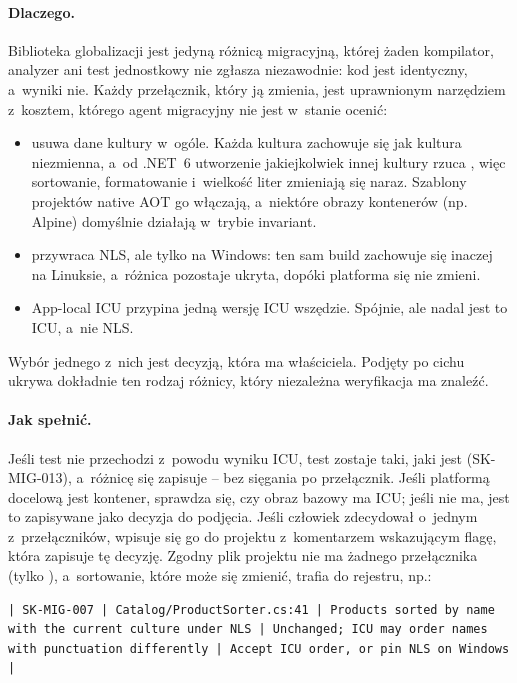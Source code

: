 \paragraph{Dlaczego.} Biblioteka globalizacji jest jedyną różnicą migracyjną, której żaden
kompilator, analyzer ani test jednostkowy nie zgłasza niezawodnie: kod jest identyczny,
a~wyniki nie. Każdy przełącznik, który ją zmienia, jest uprawnionym narzędziem z~kosztem,
którego agent migracyjny nie jest w~stanie ocenić:
\begin{itemize}
  \item {} usuwa dane kultury w~ogóle. Każda kultura
        zachowuje się jak kultura niezmienna, a~od .NET~6 utworzenie jakiejkolwiek innej
        kultury rzuca , więc sortowanie, formatowanie
        i~wielkość liter zmieniają się naraz. Szablony projektów native AOT go włączają,
        a~niektóre obrazy kontenerów (np. Alpine) domyślnie działają w~trybie invariant.
  \item {} przywraca NLS, ale tylko na Windows: ten sam build zachowuje
        się inaczej na Linuksie, a~różnica pozostaje ukryta, dopóki platforma się nie zmieni.
  \item App-local ICU przypina jedną wersję ICU wszędzie. Spójnie, ale nadal jest to ICU,
        a~nie NLS.
\end{itemize}
Wybór jednego z~nich jest decyzją, która ma właściciela. Podjęty po cichu ukrywa dokładnie
ten rodzaj różnicy, który niezależna weryfikacja ma znaleźć.

\paragraph{Jak spełnić.} Jeśli test nie przechodzi z~powodu wyniku ICU, test zostaje taki,
jaki jest (SK-MIG-013), a~różnicę się zapisuje -- bez sięgania po przełącznik. Jeśli
platformą docelową jest kontener, sprawdza się, czy obraz bazowy ma ICU; jeśli nie ma, jest
to zapisywane jako decyzja do podjęcia. Jeśli człowiek zdecydował o~jednym z~przełączników,
wpisuje się go do projektu z~komentarzem wskazującym flagę, która zapisuje tę decyzję.
Zgodny plik projektu nie ma żadnego przełącznika (tylko ),
a~sortowanie, które może się zmienić, trafia do rejestru, np.:

\begin{lstlisting}
| SK-MIG-007 | Catalog/ProductSorter.cs:41 | Products sorted by name with the current culture under NLS | Unchanged; ICU may order names with punctuation differently | Accept ICU order, or pin NLS on Windows |
\end{lstlisting}

